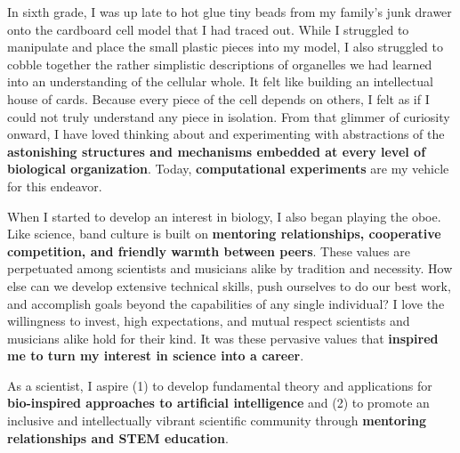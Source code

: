 In sixth grade, I was up late to hot glue tiny beads from my family's junk drawer onto the cardboard cell model that I had traced out.
While I struggled to manipulate and place the small plastic pieces into my model, I also struggled to cobble together the rather simplistic descriptions of organelles we had learned into an understanding of the cellular whole.
It felt like building an intellectual house of cards.
Because every piece of the cell depends on others, I felt as if I could not truly understand any piece in isolation.
From that glimmer of curiosity onward, I have loved thinking about and experimenting with abstractions of the \textbf{astonishing structures and mechanisms embedded at every level of biological organization}.
Today, \textbf{computational experiments} are my vehicle for this endeavor.

When I started to develop an interest in biology, I also began playing the oboe.
Like science, band culture is built on \textbf{mentoring relationships, cooperative competition, and friendly warmth between peers}.
These values are perpetuated among scientists and musicians alike by tradition and necessity.
How else can we develop extensive technical skills, push ourselves to do our best work, and accomplish goals beyond the capabilities of any single individual?
I love the willingness to invest, high expectations, and mutual respect scientists and musicians alike hold for their kind.
It was these pervasive values that \textbf{inspired me to turn my interest in science into a career}.

As a scientist, I aspire
(1) to develop fundamental theory and applications for \textbf{
bio-inspired approaches to artificial intelligence} and
(2) to promote an inclusive and intellectually vibrant scientific community through \textbf{mentoring relationships and STEM education}.
